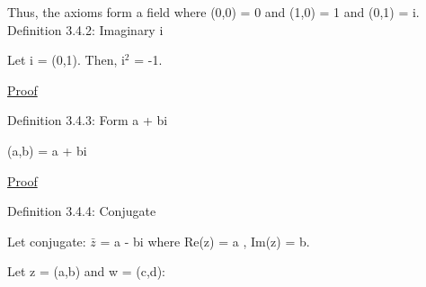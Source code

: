 	\qquad Thus, the axioms form a field where (0,0) = 0 and (1,0) = 1 and (0,1) = i. \\

{ \color{blue} Definition 3.4.2: Imaginary i } 
	
	\hspace{1cm}
	Let i = (0,1). Then, i$^2$ = -1.

{ \color{magenta} \underline{Proof} }

	
	 \vspace{0.5cm}

{ \color{blue} Definition 3.4.3: Form a + bi } 
	
	\qquad (a,b) = a + bi

{ \color{magenta} \underline{Proof} }


\newpage

{ \color{blue} Definition 3.4.4: Conjugate }
	
	\begin{adjustbox}{minipage=14cm, right, vspace=0.1cm 0cm}
		Let conjugate: $\bar{z}$ = a - bi where Re(z) = a , Im(z) = b.

		Let z = (a,b) and w = (c,d):
	\end{adjustbox}
	
